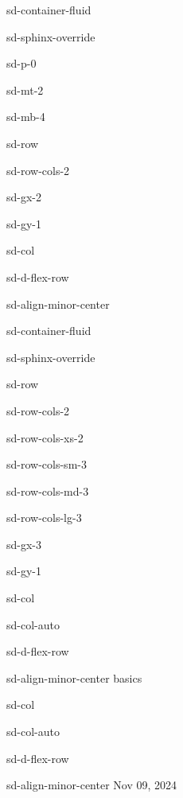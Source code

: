 \documentclass[letterpaper,10pt,english]{jupyterBook}
\begin{document}
\begin{sphinxuseclass}{sd-container-fluid}
\begin{sphinxuseclass}{sd-sphinx-override}
\begin{sphinxuseclass}{sd-p-0}
\begin{sphinxuseclass}{sd-mt-2}
\begin{sphinxuseclass}{sd-mb-4}
\begin{sphinxuseclass}{sd-row}
\begin{sphinxuseclass}{sd-row-cols-2}
\begin{sphinxuseclass}{sd-gx-2}
\begin{sphinxuseclass}{sd-gy-1}
\begin{sphinxuseclass}{sd-col}
\begin{sphinxuseclass}{sd-d-flex-row}
\begin{sphinxuseclass}{sd-align-minor-center}
\begin{sphinxuseclass}{sd-container-fluid}
\begin{sphinxuseclass}{sd-sphinx-override}
\begin{sphinxuseclass}{sd-row}
\begin{sphinxuseclass}{sd-row-cols-2}
\begin{sphinxuseclass}{sd-row-cols-xs-2}
\begin{sphinxuseclass}{sd-row-cols-sm-3}
\begin{sphinxuseclass}{sd-row-cols-md-3}
\begin{sphinxuseclass}{sd-row-cols-lg-3}
\begin{sphinxuseclass}{sd-gx-3}
\begin{sphinxuseclass}{sd-gy-1}
\begin{sphinxuseclass}{sd-col}
\begin{sphinxuseclass}{sd-col-auto}
\begin{sphinxuseclass}{sd-d-flex-row}
\begin{sphinxuseclass}{sd-align-minor-center}
\sphinxAtStartPar
basics

\end{sphinxuseclass}
\end{sphinxuseclass}
\end{sphinxuseclass}
\end{sphinxuseclass}
\begin{sphinxuseclass}{sd-col}
\begin{sphinxuseclass}{sd-col-auto}
\begin{sphinxuseclass}{sd-d-flex-row}
\begin{sphinxuseclass}{sd-align-minor-center}
\sphinxAtStartPar
Nov 09, 2024


\end{sphinxuseclass}
\end{sphinxuseclass}
\end{sphinxuseclass}
\end{sphinxuseclass}
\end{sphinxuseclass}
\end{sphinxuseclass}
\end{sphinxuseclass}
\end{sphinxuseclass}
\end{sphinxuseclass}
\end{sphinxuseclass}
\end{sphinxuseclass}
\end{sphinxuseclass}
\end{sphinxuseclass}
\end{sphinxuseclass}
\end{sphinxuseclass}
\end{sphinxuseclass}
\end{sphinxuseclass}
\end{sphinxuseclass}
\end{sphinxuseclass}
\end{sphinxuseclass}
\end{sphinxuseclass}
\end{sphinxuseclass}
\end{sphinxuseclass}
\end{sphinxuseclass}
\end{sphinxuseclass}
\end{sphinxuseclass}
\end{document}
